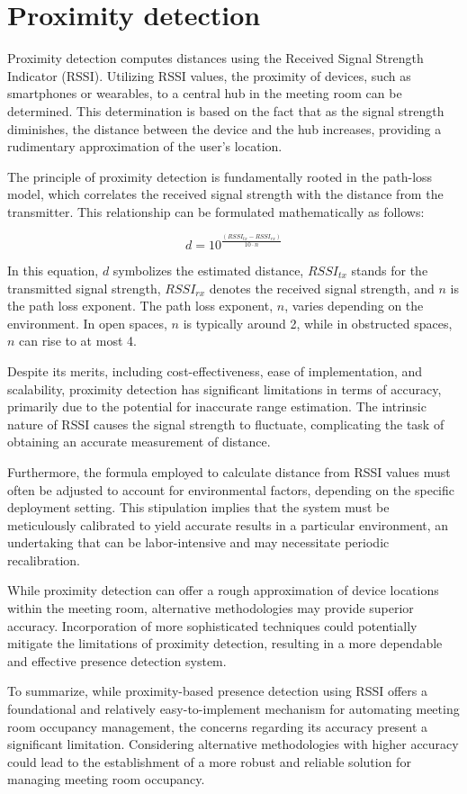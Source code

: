 \section{Proximity detection}\label{sec:proximity_detection}
Proximity detection computes distances using the Received Signal Strength Indicator (RSSI).
Utilizing RSSI values, the proximity of devices, such as smartphones or wearables, to a central hub in the meeting room can be determined. This determination is based on the fact that as the signal strength diminishes, the distance between the device and the hub increases, providing a rudimentary approximation of the user's location.

The principle of proximity detection is fundamentally rooted in the path-loss model, which correlates the received signal strength with the distance from the transmitter. This relationship can be formulated mathematically as follows:

$$
d = 10^{ \frac{(RSSI_{tx} - RSSI_{rx})}{10 \cdot n}}
$$

In this equation, \(d\) symbolizes the estimated distance, \(RSSI_{tx}\) stands for the transmitted signal strength, \(RSSI_{rx}\) denotes the received signal strength, and \(n\) is the path loss exponent. The path loss exponent, \(n\), varies depending on the environment. In open spaces, \(n\) is typically around 2, while in obstructed spaces, \(n\) can rise to at most 4.

Despite its merits, including cost-effectiveness, ease of implementation, and scalability, proximity detection has significant limitations in terms of accuracy, primarily due to the potential for inaccurate range estimation. The intrinsic nature of RSSI causes the signal strength to fluctuate, complicating the task of obtaining an accurate measurement of distance. 

Furthermore, the formula employed to calculate distance from RSSI values must often be adjusted to account for environmental factors, depending on the specific deployment setting. This stipulation implies that the system must be meticulously calibrated to yield accurate results in a particular environment, an undertaking that can be labor-intensive and may necessitate periodic recalibration.

While proximity detection can offer a rough approximation of device locations within the meeting room, alternative methodologies may provide superior accuracy. Incorporation of more sophisticated techniques could potentially mitigate the limitations of proximity detection, resulting in a more dependable and effective presence detection system.

To summarize, while proximity-based presence detection using RSSI offers a foundational and relatively easy-to-implement mechanism for automating meeting room occupancy management, the concerns regarding its accuracy present a significant limitation. Considering alternative methodologies with higher accuracy could lead to the establishment of a more robust and reliable solution for managing meeting room occupancy.
